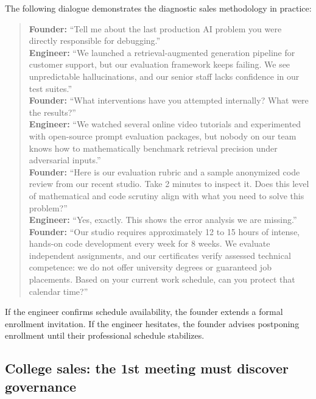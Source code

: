 The following dialogue demonstrates the diagnostic sales methodology in practice:
\begin{quote}
\textbf{Founder:} ``Tell me about the last production AI problem you were directly responsible for debugging.''\\[0.5ex]
\textbf{Engineer:} ``We launched a retrieval-augmented generation pipeline for customer support, but our evaluation framework keeps failing. We see unpredictable hallucinations, and our senior staff lacks confidence in our test suites.''\\[0.5ex]
\textbf{Founder:} ``What interventions have you attempted internally? What were the results?''\\[0.5ex]
\textbf{Engineer:} ``We watched several online video tutorials and experimented with open-source prompt evaluation packages, but nobody on our team knows how to mathematically benchmark retrieval precision under adversarial inputs.''\\[0.5ex]
\textbf{Founder:} ``Here is our evaluation rubric and a sample anonymized code review from our recent studio. Take 2 minutes to inspect it. Does this level of mathematical and code scrutiny align with what you need to solve this problem?''\\[0.5ex]
\textbf{Engineer:} ``Yes, exactly. This shows the error analysis we are missing.''\\[0.5ex]
\textbf{Founder:} ``Our studio requires approximately 12 to 15 hours of intense, hands-on code development every week for 8 weeks. We evaluate independent assignments, and our certificates verify assessed technical competence: we do not offer university degrees or guaranteed job placements. Based on your current work schedule, can you protect that calendar time?''
\end{quote}
If the engineer confirms schedule availability, the founder extends a formal enrollment invitation. If the engineer hesitates, the founder advises postponing enrollment until their professional schedule stabilizes.

\subsection{College sales: the 1st meeting must discover governance}

